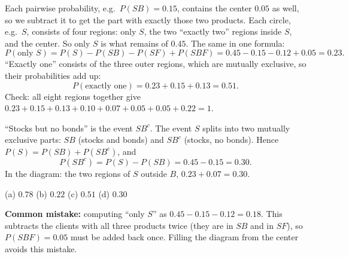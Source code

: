 \begin{solution}
	\medskip
	Each pairwise probability, e.g.\ $P(SB)=0.15$, contains the center
	$0.05$ as well, so we subtract it to get the part with exactly those two
	products. Each circle, e.g.\ $S$, consists of four regions: only $S$, the
	two ``exactly two'' regions inside $S$, and the center. So only $S$ is what
	remains of $0.45$. The same in one formula:
	\[ P(\text{only }S)=P(S)-P(SB)-P(SF)+P(SBF)=0.45-0.15-0.12+0.05=0.23. \]
	``Exactly one'' consists of the three outer regions, which are mutually
	exclusive, so their probabilities add up:
	\[ P(\text{exactly one})=0.23+0.15+0.13=0.51. \]
	Check: all eight regions together give
	$0.23+0.15+0.13+0.10+0.07+0.05+0.05+0.22=1$.

	 ``Stocks but no bonds'' is the event $SB^c$. The event $S$ splits
	into two mutually exclusive parts: $SB$ (stocks and bonds) and $SB^c$
	(stocks, no bonds). Hence $P(S)=P(SB)+P(SB^c)$, and
	\[ P(SB^c)=P(S)-P(SB)=0.45-0.15=0.30. \]
	In the diagram: the two regions of $S$ outside $B$, $0.23+0.07=0.30$.
	\begin{answer}
		(a) $0.78$ \quad (b) $0.22$ \quad (c) $0.51$ \quad (d) $0.30$
	\end{answer}
	\begin{remark}
		\textbf{Common mistake:} computing ``only $S$'' as
		$0.45-0.15-0.12=0.18$. This subtracts the clients with all three
		products twice (they are in $SB$ and in $SF$), so $P(SBF)=0.05$ must be
		added back once. Filling the diagram from the center avoids this mistake.
	\end{remark}
\end{solution}

